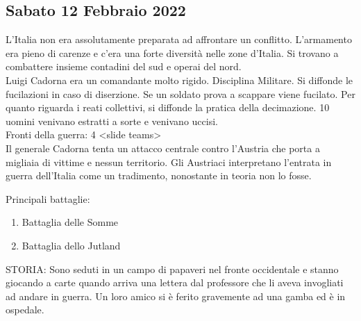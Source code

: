 \documentclass{article}
\begin{document}
\subsection{Sabato 12 Febbraio 2022}
L'Italia non era assolutamente preparata ad affrontare un conflitto. L'armamento era pieno di carenze e c'era una forte diversità nelle zone d'Italia. Si trovano a combattere insieme contadini del sud e operai del nord.
\\
Luigi Cadorna era un comandante molto rigido. Disciplina Militare. Si diffonde le fucilazioni in caso di diserzione. Se un soldato prova a scappare viene fucilato. Per quanto riguarda i reati collettivi, si diffonde la pratica della decimazione. 10 uomini venivano estratti a sorte e venivano uccisi.
\\
Fronti della guerra: 4 <slide teams>
\\
Il generale Cadorna tenta un attacco centrale contro l'Austria che porta a migliaia di vittime e nessun territorio.
Gli Austriaci interpretano l'entrata in guerra dell'Italia come un tradimento, nonostante in teoria non lo fosse.

Principali battaglie:
\begin{enumerate}
    \item Battaglia delle Somme
    \item Battaglia dello Jutland
\end{enumerate}

STORIA:
Sono seduti in un campo di papaveri nel fronte occidentale e stanno giocando a carte quando arriva una lettera dal professore che li aveva invogliati ad andare in guerra. Un loro amico si è ferito gravemente ad una gamba ed è in ospedale.
\end{document}

